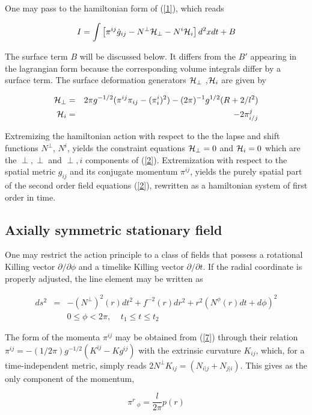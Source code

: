 \documentclass[12pt]{article}
\newcounter{c1} \newcounter{c2}
\newcommand{\bb}{\begin{equation}}
\newcommand{\ee}{\end{equation}}
\newcommand{\p}{\partial}
\newcommand{\br}{\begin{eqnarray}}
\newcommand{\er}{\end{eqnarray}}
\begin{document}
One may pass to the hamiltonian form of (\ref{1}), which reads

\bb
I = \int\left[ \pi^{ij}\dot{g}_{ij} - N^{\perp}{\cal H}_{\perp} -N^i{\cal
H}_i \right] d^2xdt + B
\label{4}
\ee

The surface term $B$ will be discussed below. It differs from
the $B'$ appearing in the lagrangian form because the
corresponding volume integrals differ by a surface term. The
surface deformation generators ${\cal H}_{\perp} $ ,$
{\cal H}_i$ are given by

\br
{\cal H}_{\perp} & = & 2\pi g^{-1/2}(\pi^{ij}\pi_{ij}-
(\pi^i_i)^2)- (2\pi)^{-1}g^{1/2}(R+2/l^2)  \\
{\cal H}_i & = & -2\pi^j_{i/j}
\er

Extremizing the hamiltonian action with respect to the the lapse
and shift functions $ N^{\perp} $, $N^{i}$, yields the
constraint equations ${\cal H }_{\perp} = 0$ and ${\cal H} _i =
0$ which are the $\perp,\perp$ and $\perp,i$ components of
(\ref{2}). Extremization with respect to the spatial metric
$g_{ij}$ and its conjugate momentum $\pi^{ij}$, yields the
purely spatial part of the second order field equations
(\ref{2}), rewritten as a hamiltonian system of first order in
time.


\subsection{ Axially  symmetric stationary field}

One may restrict the action principle to a class of fields that
possess a rotational Killing vector $\p/ \p\phi$ and
a timelike Killing vector $\p /\p t$.  If the radial
coordinate is properly adjusted, the line element may be written
as

\br
ds^2 & = & -(N^{\perp})^2(r)dt^2 +
f^{-2}(r)dr^2  + r^2(N^\phi (r)dt + d\phi)^2 \nonumber \\
 & &  0 \leq  \phi < 2\pi ,\;\;  \;\; t_1 \leq t \leq t_2
\label{7}
\er

The form of the momenta  $\pi^{ij}$ may be obtained from
(\ref{7}) through their relation $\pi^{ij} = - (1/2 \pi) g^{-1/2}
(K^{ij} - Kg^{ij})$ with the extrinsic curvature $K_{ij}$,
which, for a time-independent metric, simply reads $2 N^{\perp} K_{ij} =
(N_{i|j} + N_{j|i})$. This gives as the only component of the
momentum,

\bb
\pi^r\,_{\phi} = \frac{l}{2 \pi} p(r)
\label{8}
\ee
\end{document}
